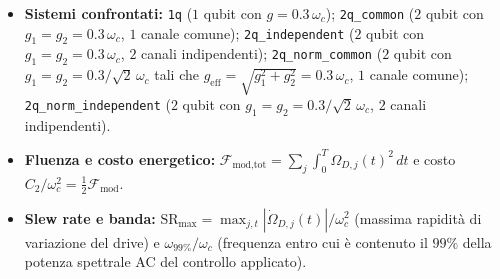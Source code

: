 \documentclass[10pt,a4paper]{article}
\begin{document}
\vspace{6pt}
\footnotesize
\noindent
\begin{itemize}\setlength{\itemsep}{2pt}
    \item \textbf{Sistemi confrontati:} \texttt{1q} ($1$ qubit con $g=0.3\,\omega_c$); \texttt{2q\_common} ($2$ qubit con $g_1=g_2=0.3\,\omega_c$, $1$ canale comune); \texttt{2q\_independent} ($2$ qubit con $g_1=g_2=0.3\,\omega_c$, $2$ canali indipendenti); \texttt{2q\_norm\_common} ($2$ qubit con $g_1=g_2=0.3/\sqrt{2}\,\omega_c$ tali che $g_{\text{eff}} = \sqrt{g_1^2+g_2^2} = 0.3\,\omega_c$, $1$ canale comune); \texttt{2q\_norm\_independent} ($2$ qubit con $g_1=g_2=0.3/\sqrt{2}\,\omega_c$, $2$ canali indipendenti).
    \item \textbf{Fluenza e costo energetico:} $\mathcal{F}_{\text{mod,tot}} = \sum_j \int_0^T \Omega_{D,j}(t)^2\,dt$ e costo $C_2/\omega_c^2 = \frac{1}{2}\mathcal{F}_{\text{mod}}$.
    \item \textbf{Slew rate e banda:} $\text{SR}_{\max} = \max_{j,t} |\dot{\Omega}_{D,j}(t)|/\omega_c^2$ (massima rapidità di variazione del drive) e $\omega_{99\%}/\omega_c$ (frequenza entro cui è contenuto il $99\%$ della potenza spettrale AC del controllo applicato).
\end{itemize}
\end{document}
